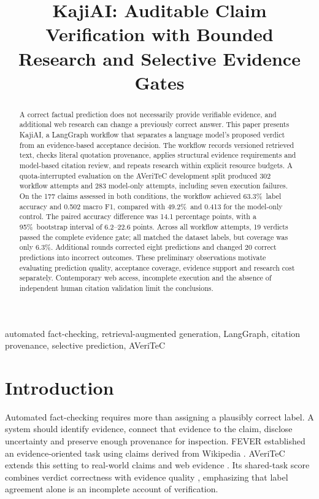 \documentclass[conference]{IEEEtran}
\newcommand{\pct}{\%}
\begin{document}
\title{KajiAI: Auditable Claim Verification with Bounded Research and Selective Evidence Gates}

\author{
}
\maketitle

\begin{abstract}
A correct factual prediction does not necessarily provide verifiable evidence, and additional web research can change a previously correct answer. This paper presents KajiAI, a LangGraph workflow that separates a language model's proposed verdict from an evidence-based acceptance decision. The workflow records versioned retrieved text, checks literal quotation provenance, applies structural evidence requirements and model-based citation review, and repeats research within explicit resource budgets. A quota-interrupted evaluation on the AVeriTeC development split produced 302 workflow attempts and 283 model-only attempts, including seven execution failures. On the 177 claims assessed in both conditions, the workflow achieved 63.3\pct\ label accuracy and 0.502 macro F1, compared with 49.2\pct\ and 0.413 for the model-only control. The paired accuracy difference was 14.1 percentage points, with a 95\pct\ bootstrap interval of 6.2--22.6 points. Across all workflow attempts, 19 verdicts passed the complete evidence gate; all matched the dataset labels, but coverage was only 6.3\pct. Additional rounds corrected eight predictions and changed 20 correct predictions into incorrect outcomes. These preliminary observations motivate evaluating prediction quality, acceptance coverage, evidence support and research cost separately. Contemporary web access, incomplete execution and the absence of independent human citation validation limit the conclusions.
\end{abstract}

\begin{IEEEkeywords}
automated fact-checking, retrieval-augmented generation, LangGraph, citation provenance, selective prediction, AVeriTeC
\end{IEEEkeywords}

\section{Introduction}
Automated fact-checking requires more than assigning a plausibly correct label. A system should identify evidence, connect that evidence to the claim, disclose uncertainty and preserve enough provenance for inspection. FEVER established an evidence-oriented task using claims derived from Wikipedia \cite{fever}. AVeriTeC extends this setting to real-world claims and web evidence \cite{averitec}. Its shared-task score combines verdict correctness with evidence quality \cite{sharedtask}, emphasizing that label agreement alone is an incomplete account of verification.
\end{document}
